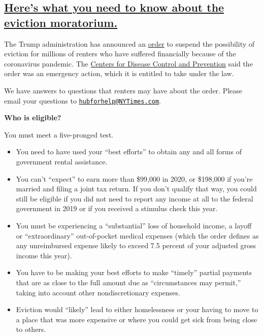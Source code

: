 \hypertarget{heres-what-you-need-to-know-about-the-eviction-moratorium}{%
\subsection{\texorpdfstring{\protect\hyperlink{heres-what-you-need-to-know-about-the-eviction-moratorium}{Here's
what you need to know about the eviction
moratorium.}}{Here's what you need to know about the eviction moratorium.}}\label{heres-what-you-need-to-know-about-the-eviction-moratorium}}

The Trump administration has announced an
\href{https://s3.amazonaws.com/public-inspection.federalregister.gov/2020-19654.pdf}{order}
to suspend the possibility of eviction for millions of renters who have
suffered financially because of the coronavirus pandemic. The
\href{https://www.nytimes3xbfgragh.onion/2020/09/01/business/eviction-moratorium-order.html}{Centers
for Disease Control and Prevention} said the order was an emergency
action, which it is entitled to take under the law.

We have answers to questions that renters may have about the order.
Please email your questions to
\href{mailto:hubforhelp@NYTimes.com}{\nolinkurl{hubforhelp@NYTimes.com}}.

\textbf{Who is eligible?}

You must meet a five-pronged test.

\begin{itemize}
\item
  You need to have used your ``best efforts'' to obtain any and all
  forms of government rental assistance.
\item
  You can't ``expect'' to earn more than \$99,000 in 2020, or \$198,000
  if you're married and filing a joint tax return. If you don't qualify
  that way, you could still be eligible if you did not need to report
  any income at all to the federal government in 2019 or if you received
  a stimulus check this year.
\item
  You must be experiencing a ``substantial'' loss of household income, a
  layoff or ``extraordinary'' out-of-pocket medical expenses (which the
  order defines as any unreimbursed expense likely to exceed 7.5 percent
  of your adjusted gross income this year).
\item
  You have to be making your best efforts to make ``timely'' partial
  payments that are as close to the full amount due as ``circumstances
  may permit,'' taking into account other nondiscretionary expenses.
\item
  Eviction would ``likely'' lead to either homelessness or your having
  to move to a place that was more expensive or where you could get sick
  from being close to others.
\end{itemize}

